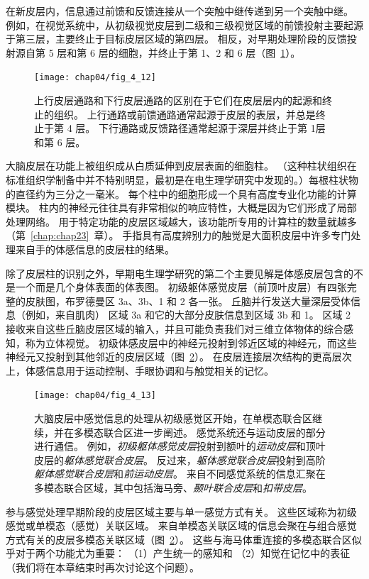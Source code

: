 在新皮层内，信息通过前馈和反馈连接从一个突触中继传递到另一个突触中继。 
例如，在视觉系统中，从初级视觉皮层到二级和三级视觉区域的前馈投射主要起源于第三层，主要终止于目标皮层区域的第四层。 
相反，对早期处理阶段的反馈投射源自第 5 层和第 6 层的细胞，并终止于第 1、2 和 6 层（图~\ref{fig:4_12}）。

\begin{figure}[htbp]
	\centering
	\texttt{[image: chap04/fig\_4\_12]}
	\caption{上行皮层通路和下行皮层通路的区别在于它们在皮层层内的起源和终止的组织。
		上行通路或前馈通路通常起源于皮层的表层，并总是终止于第 4 层。
		下行通路或反馈路径通常起源于深层并终止于第 1层和第 6 层\cite{felleman1991distributed}。}
	\label{fig:4_12}
\end{figure}


大脑皮层在功能上被组织成从白质延伸到皮层表面的细胞柱。 
（这种柱状组织在标准组织学制备中并不特别明显，最初是在电生理学研究中发现的。）每根柱状物的直径约为三分之一毫米。 
每个柱中的细胞形成一个具有高度专业化功能的计算模块。
柱内的神经元往往具有非常相似的响应特性，大概是因为它们形成了局部处理网络。 
用于特定功能的皮层区域越大，该功能所专用的计算柱的数量就越多（第~\ref{chap:chap23}~章）。 
手指具有高度辨别力的触觉是大面积皮层中许多专门处理来自手的体感信息的皮层柱的结果。


除了皮层柱的识别之外，早期电生理学研究的第二个主要见解是体感皮层包含的不是一个而是几个身体表面的体表图。
初级躯体感觉皮层（前顶叶皮层）有四张完整的皮肤图，布罗德曼区 3a、3b、1 和 2 各一张。
丘脑并行发送大量深层受体信息（例如，来自肌肉） 区域 3a 和它的大部分皮肤信息到区域 3b 和 1。
区域 2 接收来自这些丘脑皮层区域的输入，并且可能负责我们对三维立体物体的综合感知，称为立体视觉。
初级体感皮层中的神经元投射到邻近区域的神经元，而这些神经元又投射到其他邻近的皮层区域（图~\ref{fig:4_13}）。
在皮层连接层次结构的更高层次上，体感信息用于运动控制、手眼协调和与触觉相关的记忆。


\begin{figure}[htbp]
	\centering
	\texttt{[image: chap04/fig\_4\_13]}
	\caption{大脑皮层中感觉信息的处理从初级感觉区开始，在单模态联合区继续，并在多模态联合区进一步阐述。
		感觉系统还与运动皮层的部分进行通信。
		例如，\textit{初级躯体感觉皮层}投射到额叶的\textit{运动皮层}和顶叶皮层的\textit{躯体感觉联合皮层}。
		反过来，\textit{躯体感觉联合皮层}投射到高阶\textit{躯体感觉联合皮层}和\textit{前运动皮层}。
		来自不同感觉系统的信息汇聚在多模态联合区域，其中包括海马旁、\textit{颞叶联合皮层}和\textit{扣带皮层}。}
	\label{fig:4_13}
\end{figure}


参与感觉处理早期阶段的皮层区域主要与单一感觉方式有关。
这些区域称为初级感觉或单模态（感觉）关联区域。
来自单模态关联区域的信息会聚在与组合感觉方式有关的皮层多模态关联区域（图~\ref{fig:4_13}）。
这些与海马体重连接的多模态联合区似乎对于两个功能尤为重要：
（1）产生统一的感知和 
（2）知觉在记忆中的表征
（我们将在本章结束时再次讨论这个问题）。


